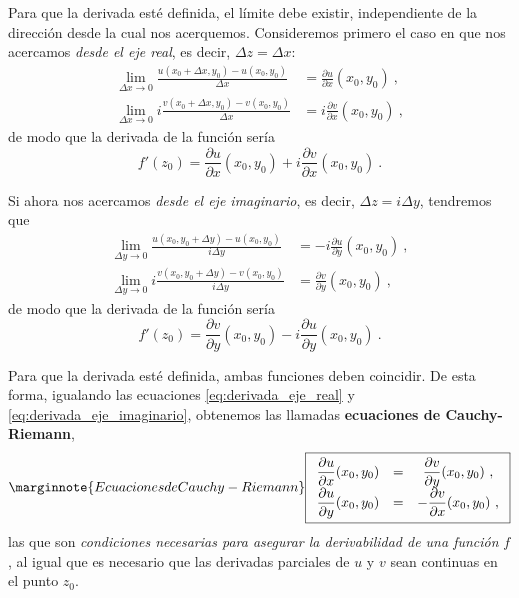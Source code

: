 Para que la derivada esté definida, el límite debe existir, independiente de la dirección desde la cual nos acerquemos. Consideremos primero el caso en que nos acercamos \emph{desde el eje real}, es decir, $\Delta z = \Delta x$:
\begin{align*}
    \lim_{\Delta x \to 0} \frac{u(x_0 + \Delta x, y_0) - u(x_0, y_0)}{\Delta x} & = \frac{\partial u}{\partial x}(x_0, y_0) \ , \\
    \lim_{\Delta x \to 0} i \frac{v(x_0 + \Delta x, y_0) - v(x_0, y_0)}{\Delta x} & = i \frac{\partial v}{\partial x}(x_0, y_0) \ ,
\end{align*}
de modo que la derivada de la función sería
\begin{equation}\label{eq:derivada_eje_real}
    f'(z_0) = \frac{\partial u}{\partial x}(x_0, y_0) + i \frac{\partial v}{\partial x} (x_0, y_0) \ .
\end{equation}

Si ahora nos acercamos \emph{desde el eje imaginario}, es decir, $\Delta z = i\Delta y$, tendremos que
\begin{align*}
    \lim_{\Delta y \to 0} \frac{u(x_0, y_0 + \Delta y) - u(x_0, y_0)}{i \Delta y} & = -i \frac{\partial u}{\partial y}(x_0, y_0) \ , \\
    \lim_{\Delta y \to 0} i \frac{v(x_0, y_0 + \Delta y) - v(x_0, y_0)}{i \Delta y} & = \frac{\partial v}{\partial y}(x_0, y_0) \ ,
\end{align*}
de modo que la derivada de la función sería
\begin{equation}\label{eq:derivada_eje_imaginario}
    f'(z_0) = \frac{\partial v}{\partial y}(x_0, y_0) - i \frac{\partial u}{\partial y} (x_0, y_0) \ .
\end{equation}

Para que la derivada esté definida, ambas funciones deben coincidir. De esta forma, igualando las ecuaciones \eqref{eq:derivada_eje_real} y \eqref{eq:derivada_eje_imaginario}, obtenemos las llamadas \textbf{ecuaciones de Cauchy-Riemann},
\begingroup
\renewcommand*{\arraystretch}{2}
\begin{equation} \label{eq:cauchy-riemann} \marginnote{Ecuaciones de Cauchy-Riemann}
    \boxed{
        \begin{array}{ccc}
            \dfrac{\partial u}{\partial x}(x_0, y_0) & = & \dfrac{\partial v}{\partial y}(x_0, y_0) \ , \\
            \dfrac{\partial u}{\partial y}(x_0, y_0) & = & - \dfrac{\partial v}{\partial x}(x_0, y_0) \ ,
        \end{array}
    }
\end{equation}
\endgroup
las que son \emph{condiciones necesarias para asegurar la derivabilidad de una función} $f$, al igual que es necesario que las derivadas parciales de $u$ y $v$ sean continuas en el punto $z_0$.

